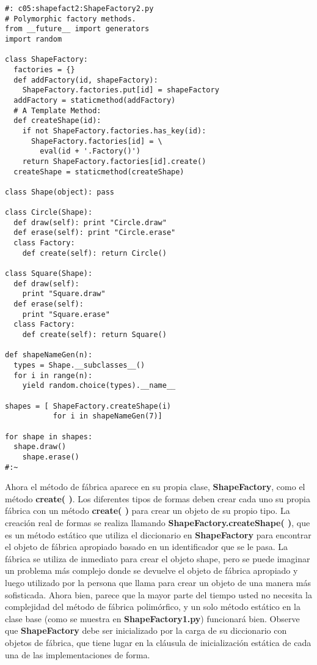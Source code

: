 \begin{lstlisting} 
#: c05:shapefact2:ShapeFactory2.py 
# Polymorphic factory methods. 
from __future__ import generators 
import random 

class ShapeFactory: 
  factories = {} 
  def addFactory(id, shapeFactory): 
    ShapeFactory.factories.put[id] = shapeFactory 
  addFactory = staticmethod(addFactory) 
  # A Template Method: 
  def createShape(id): 
    if not ShapeFactory.factories.has_key(id): 
      ShapeFactory.factories[id] = \ 
        eval(id + '.Factory()') 
    return ShapeFactory.factories[id].create() 
  createShape = staticmethod(createShape) 
  
class Shape(object): pass 

class Circle(Shape): 
  def draw(self): print "Circle.draw"  
  def erase(self): print "Circle.erase" 
  class Factory: 
    def create(self): return Circle()  
    
class Square(Shape): 
  def draw(self):  
    print "Square.draw"  
  def erase(self):  
    print "Square.erase"  
  class Factory: 
    def create(self): return Square() 
    
def shapeNameGen(n): 
  types = Shape.__subclasses__() 
  for i in range(n): 
    yield random.choice(types).__name__ 
    
shapes = [ ShapeFactory.createShape(i)  
           for i in shapeNameGen(7)] 
           
for shape in shapes: 
  shape.draw() 
    shape.erase() 
#:~ 
\end{lstlisting}

Ahora el método de fábrica aparece en su propia clase, \textbf{ShapeFactory}, como el método \textbf{create( )}. Los diferentes tipos de formas deben crear cada uno su propia fábrica con un método \textbf{create( )} para crear un objeto de su propio tipo. La creación real de formas se realiza llamando \textbf{ShapeFactory.createShape( )}, que es un método estático que utiliza el diccionario en \textbf{ShapeFactory} para encontrar el objeto de fábrica apropiado basado en un identificador que se le pasa. La fábrica se utiliza de inmediato para crear el objeto shape, pero se puede imaginar un problema más complejo donde se devuelve el objeto de fábrica apropiado y luego utilizado por la persona que llama para crear un objeto de una manera más sofisticada. Ahora bien, parece que la mayor parte del tiempo usted no necesita la complejidad del método de fábrica polimórfico, y un solo método estático en la clase base (como se muestra en \textbf{ShapeFactory1.py}) funcionará bien. Observe que \textbf{ShapeFactory} debe ser inicializado por la carga de su diccionario con objetos de fábrica, que tiene lugar en la cláusula de inicialización estática de cada una de las implementaciones de forma.   \newline

